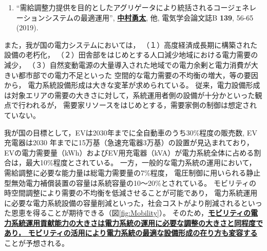 \documentclass[11pt,a4paper,uplatex,dvipdfmx]{ujarticle} 		%
\newcommand{\研究課題名}{モビリティの時空間調整を活用した電力設備形成構築}
\newcommand{\研究機関名}{名古屋工業大学}
\newcommand{\研究代表者氏名}{中村勇太}
\newcommand{\研究期間の最終元号年度}{10}  %
\newcommand{\paper}[6]{%
	\item ``#1'', #2, #3 {\bf #4}, #5 (#6).			%
}
\begin{document}
\begin{enumerate}
	\setlength{\itemsep}{-5pt}
	\setcounter{enumi}{1}
	\paper{需給調整力提供を目的としたアグリゲータにより統括されるコージェネレーションシステムの最適運用}{\textbf{\ul{中村勇太}}, 他}{電気学会論文誌B}{139}{56-65}{2019}\label{pub:reg_by_CGS}
\end{enumerate}

また，我が国の電力システムにおいては，%
（１）高度経済成長期に構築された設備の老朽化，
（２）田舎部をはじめとする人口減少地域における電力需要の減少，
（３）自然変動電源の大量導入された地域での電力余剰と電力消費が大きい都市部での電力不足といった
空間的な電力需要の不均衡の増大，等の要因から，
電力系統設備形成は大きな変革が求められている。
従来，電力設備形成は対象エリアの需要の大きさに対して，系統運用者側の設備が十分かといった観点で行われるが，
需要家リソースをはじめとする，需要家側の制御は想定されていない。

我が国の目標として，EVは2030年までに全自動車のうち30\%程度の販売数,
EV充電器は2030 年までに15万基（急速充電器3万基）の設置が見込まれており，
EVの電力需要量（kWh）およびEV用充電器（kVA）が電力系統全体に占める割合は，最大10\%程度とされている。
一方，一般的な電力系統の運用において，
需給調整に必要な能力量は総電力需要量の7\%程度，
電圧制御に用いられる静止型無効電力補償装置の容量は系統容量の10～20\%とされている。
モビリティの時空間調整により需要の不均衡を低減させることが可能であり，%
電力系統運用に必要な電力系統設備の容量削減といった，社会コストがより削減されるといった恩恵を得ることが期待できる（図\ref{fig:Mobility}）。
そのため，\textbf{\ul{モビリティの電力系統運用貢献能力の大きさは電力系統の運用に必要な調整の大きさと同程度であり，
モビリティの活用により電力系統の最適な設備形成の在り方も変容する}}ことが予想される。


\end{document}

